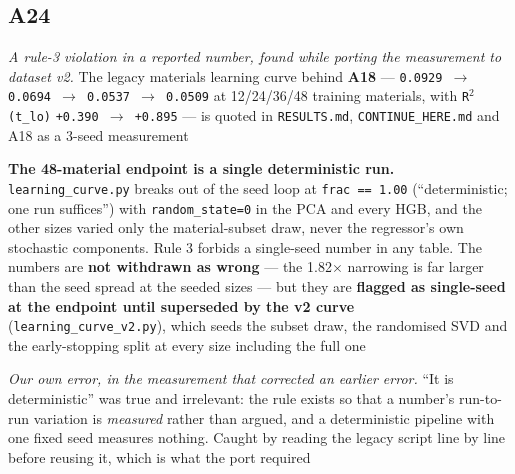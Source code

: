 \documentclass[10pt]{article}
\begin{document}
\subsection*{A24}\label{led:A24}
\begin{description}[leftmargin=0pt,itemsep=1pt]
\item[Claim withdrawn.] \emph{A rule-3 violation in a reported number, found while porting the measurement to dataset v2.} The legacy materials learning curve behind \textbf{A18} --- \texttt{0.0929 $\rightarrow$ 0.0694 $\rightarrow$ 0.0537 $\rightarrow$ 0.0509} at 12/24/36/48 training materials, with \texttt{R$^2$(t\_lo)} \texttt{+0.390 $\rightarrow$ +0.895} --- is quoted in \texttt{RESULTS.md}, \texttt{CONTINUE\_HERE.md} and A18 as a 3-seed measurement
\item[Replaced with.] \textbf{The 48-material endpoint is a single deterministic run.} \texttt{learning\_curve.py} breaks out of the seed loop at \texttt{frac == 1.00} (``deterministic; one run suffices'') with \texttt{random\_state=0} in the PCA and every HGB, and the other sizes varied only the material-subset draw, never the regressor's own stochastic components. Rule 3 forbids a single-seed number in any table. The numbers are \textbf{not withdrawn as wrong} --- the 1.82$\times$ narrowing is far larger than the seed spread at the seeded sizes --- but they are \textbf{flagged as single-seed at the endpoint until superseded by the v2 curve} (\texttt{learning\_curve\_v2.py}), which seeds the subset draw, the randomised SVD and the early-stopping split at every size including the full one
\item[Why it was wrong.] \emph{Our own error, in the measurement that corrected an earlier error.} ``It is deterministic'' was true and irrelevant: the rule exists so that a number's run-to-run variation is \emph{measured} rather than argued, and a deterministic pipeline with one fixed seed measures nothing. Caught by reading the legacy script line by line before reusing it, which is what the port required
\end{description}
\end{document}
